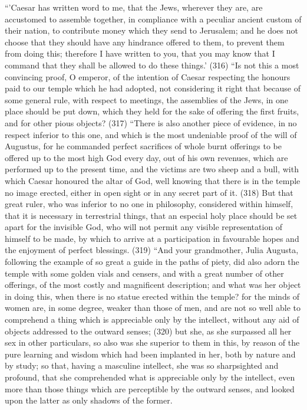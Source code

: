 ``'Caesar has written word to me, that the Jews, wherever they are, are accustomed to assemble
together, in compliance with a peculiar ancient custom of their nation, to contribute money which
they send to Jerusalem; and he does not choose that they should have any hindrance offered to
them, to prevent them from doing this; therefore I have written to you, that you may know that I
command that they shall be allowed to do these things.' (316) ``Is not this a most convincing proof,
O emperor, of the intention of Caesar respecting the honours paid to our temple which he had
adopted, not considering it right that because of some general rule, with respect to meetings, the
assemblies of the Jews, in one place should be put down, which they held for the sake of offering
the first fruits, and for other pious objects? (317) ``There is also another piece of evidence, in no
respect inferior to this one, and which is the most undeniable proof of the will of Augustus, for he
commanded perfect sacrifices of whole burnt offerings to be offered up to the most high God
every day, out of his own revenues, which are performed up to the present time, and the victims
are two sheep and a bull, with which Caesar honoured the altar of God, well knowing that there is in
the temple no image erected, either in open sight or in any secret part of it. (318) But that great
ruler, who was inferior to no one in philosophy, considered within himself, that it is necessary in
terrestrial things, that an especial holy place should be set apart for the invisible God, who will not
permit any visible representation of himself to be made, by which to arrive at a participation in
favourable hopes and the enjoyment of perfect blessings. (319) ``And your grandmother, Julia
Augusta, following the example of so great a guide in the paths of piety, did also adorn the temple
with some golden vials and censers, and with a great number of other offerings, of the most costly
and magnificent description; and what was her object in doing this, when there is no statue erected
within the temple? for the minds of women are, in some degree, weaker than those of men, and are
not so well able to comprehend a thing which is appreciable only by the intellect, without any aid of
objects addressed to the outward senses; (320) but she, as she surpassed all her sex in other
particulars, so also was she superior to them in this, by reason of the pure learning and wisdom
which had been implanted in her, both by nature and by study; so that, having a masculine intellect,
she was so sharpsighted and profound, that she comprehended what is appreciable only by the
intellect, even more than those things which are perceptible by the outward senses, and looked
upon the latter as only shadows of the former.

